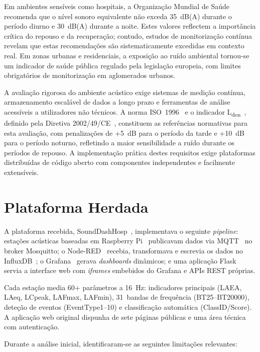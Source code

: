 \documentclass[12pt,a4paper]{report}
\begin{document}
Em ambientes sensíveis como hospitais, a Organização Mundial de Saúde~\cite{oms2018} recomenda que o nível sonoro equivalente não exceda 35~dB(A) durante o período diurno e 30~dB(A) durante a noite. Estes valores reflectem a importância crítica do repouso e da recuperação; contudo, estudos de monitorização contínua revelam que estas recomendações são sistematicamente excedidas em contexto real. Em zonas urbanas e residenciais, a exposição ao ruído ambiental tornou-se um indicador de saúde pública regulado pela legislação europeia, com limites obrigatórios de monitorização em aglomerados urbanos.

A avaliação rigorosa do ambiente acústico exige sistemas de medição contínua, armazenamento escalável de dados a longo prazo e ferramentas de análise acessíveis a utilizadores não técnicos. A norma ISO~1996~\cite{iso1996} e o indicador L\textsubscript{den}~\cite{lden}, definido pela Diretiva 2002/49/CE~\cite{lden}, constituem as referências normativas para esta avaliação, com penalizações de +5~dB para o período da tarde e +10~dB para o período noturno, refletindo a maior sensibilidade a ruído durante os períodos de repouso. A implementação prática destes requisitos exige plataformas distribuídas de código aberto com componentes independentes e facilmente extensíveis.

\section{Plataforma Herdada}

A plataforma recebida, SoundDashHosp~\cite{prevSoundDash}, implementava o seguinte \textit{pipeline}: estações acústicas baseadas em Raspberry Pi~\cite{raspberrypi} publicavam dados via MQTT~\cite{mqtt} no broker Mosquitto; o Node-RED~\cite{nodered} recebia, transformava e escrevia os dados no InfluxDB~\cite{influxdb}; o Grafana~\cite{grafana} gerava \textit{dashboards} dinâmicos; e uma aplicação Flask~\cite{flask} servia a interface web com \textit{iframes} embebidos do Grafana e APIs REST próprias.

Cada estação media 60+ parâmetros a 16~Hz: indicadores principais (LAEA, LAeq, LCpeak, LAFmax, LAFmin), 31~bandas de frequência (BT25--BT20000), deteção de eventos (EventType1--10) e classificação automática (ClassID/Score). A aplicação web original dispunha de sete páginas públicas e uma área técnica com autenticação.

Durante a análise inicial, identificaram-se as seguintes limitações relevantes:
\end{document}
